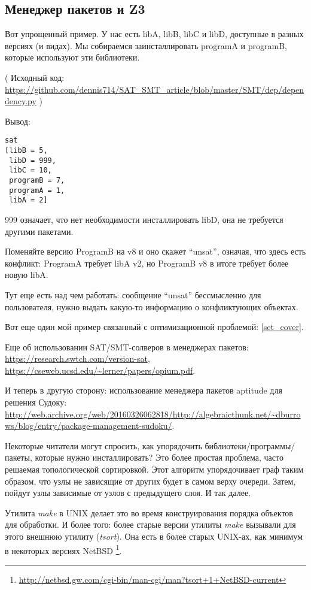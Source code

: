 \subsection{Менеджер пакетов и Z3}

Вот упрощенный пример.
У нас есть libA, libB, libC и libD, доступные в разных версиях (и видах).
Мы собираемся заинсталлировать programA и programB, которые используют эти библиотеки.



( Исходный код: \url{https://github.com/dennis714/SAT_SMT_article/blob/master/SMT/dep/dependency.py} )

Вывод:

\begin{lstlisting}
sat
[libB = 5,
 libD = 999,
 libC = 10,
 programB = 7,
 programA = 1,
 libA = 2]
\end{lstlisting}

999 означает, что нет необходимости инсталлировать libD, она не требуется другими пакетами.

Поменяйте версию ProgramB на v8 и оно скажет ``unsat'', означая, что здесь есть конфликт:
ProgramA требует libA v2, но ProgramB v8 в итоге требует более новую libA.

Тут еще есть над чем работать: сообщение ``unsat'' бессмысленно для пользователя, нужно выдать какую-то информацию
о конфликтующих объектах.

Вот еще один мой пример связанный с оптимизационной проблемой: \ref{set_cover}.

Еще об использовании SAT/SMT-солверов в менеджерах пакетов: \url{https://research.swtch.com/version-sat},
\url{https://cseweb.ucsd.edu/~lerner/papers/opium.pdf}.

И теперь в другую сторону: использование менеджера пакетов aptitude для решения Судоку: \\
\url{http://web.archive.org/web/20160326062818/http://algebraicthunk.net/~dburrows/blog/entry/package-management-sudoku/}.

Некоторые читатели могут спросить, как упорядочить библиотеки/программы/пакеты, которые нужно инсталлировать?
Это более простая проблема, часто решаемая топологической сортировкой.
Этот алгоритм упорядочивает граф таким образом, что узлы не зависящие от других будет в самом верху очереди.
Затем, пойдут узлы зависимые от узлов с предыдущего слоя.
И так далее.

Утилита \textit{make} в UNIX делает это во время конструирования порядка объектов для обработки.
И более того: более старые версии утилиты \textit{make} вызывали для этого внешнюю утилиту (\textit{tsort}).
Она есть в более старых UNIX-ах, как минимум в некоторых версиях NetBSD
\footnote{\url{http://netbsd.gw.com/cgi-bin/man-cgi/man?tsort+1+NetBSD-current}}.

